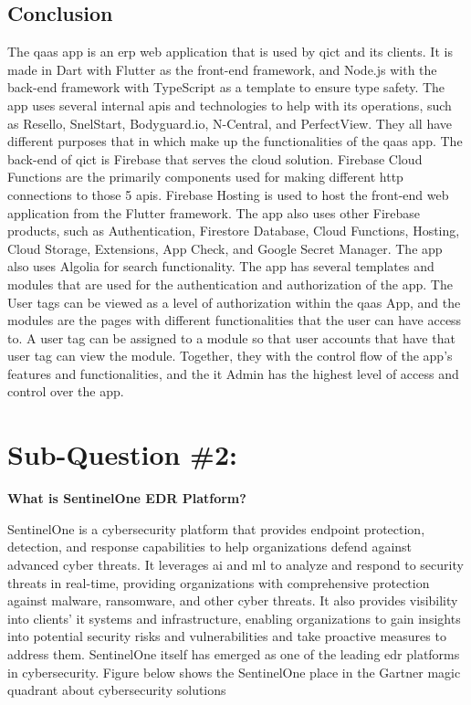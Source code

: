 \subsection{Conclusion}
The \acrshort{qaas} app is an \acrshort{erp} web application that is used by \acrshort{qict} and its clients.
It is made in Dart with Flutter as the front-end framework, and Node.js with the back-end  framework with
TypeScript as a template to ensure type safety. The app uses several internal \acrshort{api}s and technologies to
help with its operations, such as Resello, SnelStart, Bodyguard.io, N-Central, and PerfectView. They all have different
purposes that in which make up the functionalities of the \acrshort{qaas} app. The back-end of \acrshort{qict} is Firebase that serves the
cloud solution. Firebase Cloud Functions are the primarily components used for making different \acrshort{http} connections to those 5
\acrshort{api}s. Firebase Hosting is used to host the front-end web application from the Flutter framework. The app also
uses other Firebase products, such as Authentication, Firestore Database, Cloud Functions, Hosting, Cloud
Storage, Extensions, App Check, and Google Secret Manager. The app also uses Algolia for search functionality. The app
has several templates and modules that are used for the authentication and authorization of the app.
The User tags can be viewed as a level of authorization within the \acrshort{qaas} App, and the modules are the pages
with different functionalities that the user can have access to. A user tag can be assigned to a module so that user
accounts that have that user tag can view the module. Together, they with the control flow of the app's features and functionalities,
and the \acrshort{it} Admin has the highest level of access and control over the app.

\section{Sub-Question \#2:}
\textbf{What is SentinelOne EDR Platform?}

SentinelOne is a cybersecurity platform that provides endpoint protection, detection, and response capabilities to
help organizations defend against advanced cyber threats. It leverages \acrshort{ai} and \acrshort{ml} to analyze
and respond to security threats in real-time, providing organizations with comprehensive protection against malware,
ransomware, and other cyber threats. It also provides visibility into clients' \acrshort{it} systems and infrastructure,
enabling organizations to gain insights into potential security risks and vulnerabilities and take proactive measures
to address them. SentinelOne itself has emerged as one of the leading \acrshort{edr} platforms in cybersecurity. Figure below shows the
SentinelOne place in the Gartner magic quadrant about cybersecurity solutions

